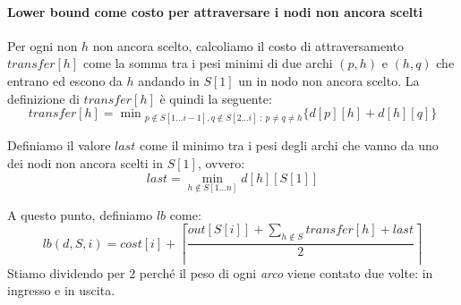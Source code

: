 \paragraph{Lower bound come costo per attraversare i nodi non ancora scelti}
\begin{definition}
    Per ogni non $h$ non ancora scelto, calcoliamo il costo di attraversamento
    $transfer[h]$ come la somma tra i pesi minimi di due archi $(p,h)$ e $(h,q)$
    che entrano ed escono da $h$ andando in $S[1]$ un in nodo non ancora scelto.
    La definizione di $transfer[h]$ è quindi la seguente:
    \[transfer[h]=\min{}_{p\notin S[1\dots i-1],q\notin S[2\dots i]\::\:p\neq
    q\neq h}\{d[p][h]+d[h][q]\}\]
\end{definition}
\begin{definition}
    Definiamo il valore $last$ come il minimo tra i pesi degli archi che vanno
    da uno dei nodi non ancora scelti in $S[1]$, ovvero:
    \[last=\min_{h\notin S[1\dots n]}d[h][S[1]]\]
\end{definition}

\noindent
A questo punto, definiamo $lb$ come:
\[lb(d,S,i)=cost[i]+\left\lceil\frac{out[S[i]]+\sum_{h\notin S}transfer[h]+last}{2}\right\rceil\]
Stiamo dividendo per $2$ perché il peso di ogni \emph{arco} viene contato due volte:
in ingresso e in uscita.

